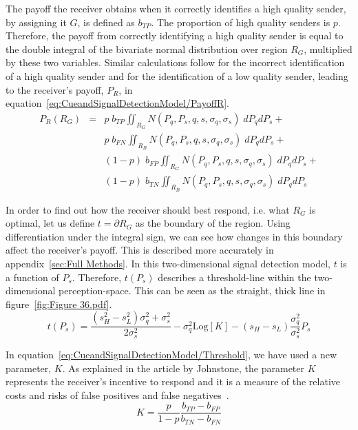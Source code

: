 \documentclass[a4paper,12pt]{article}
\numberwithin{equation}{section}
\begin{document}
The payoff the receiver obtains when it correctly identifies a high quality sender, by assigning it $G$, is defined as $b_{TP}$. The proportion of high quality senders is $p$. Therefore, the payoff from correctly identifying a high quality sender is equal to the double integral of the bivariate normal distribution over region $R_{G}$, multiplied by these two variables. Similar calculations follow for the incorrect identification of a high quality sender and for the identification of a low quality sender, leading to the receiver's payoff, $P_{R}$, in equation~\ref{eq:CueandSignalDetectionModel/PayoffR}.
\begin{equation}
\label{eq:CueandSignalDetectionModel/PayoffR}
\begin{array}{rcl}
P_{R}(R_{G}) &=& p \; b_{TP} \displaystyle \iint_{R_{G}} N(P_{q}, P_{s}, q, s, \sigma_{q}, \sigma_{s}) \; dP_{q}dP_{s} +\\
&&p \; b_{FN} \displaystyle \iint_{R_{B}} N(P_{q}, P_{s}, q, s, \sigma_{q}, \sigma_{s}) \; dP_{q}dP_{s} +\\
&&(1-p) \; b_{FP} \displaystyle \iint_{R_{G}} N(P_{q}, P_{s}, q, s, \sigma_{q}, \sigma_{s}) \; dP_{q}dP_{s} +\\
&&(1-p) \; b_{TN} \displaystyle \iint_{R_{B}} N(P_{q}, P_{s}, q, s, \sigma_{q}, \sigma_{s}) \; dP_{q}dP_{s}
\end{array}
\end{equation}

In order to find out how the receiver should best respond, i.e. what $R_{G}$ is optimal, let us define $t=\partial R_{G}$ as the boundary of the region. Using differentiation under the integral sign, we can see how changes in this boundary affect the receiver's payoff. This is described more accurately in appendix~\ref{sec:Full Methods}. In this two-dimensional signal detection model, $t$ is a function of $P_{s}$. Therefore, $t(P_{s})$ describes a threshold-line within the two-dimensional perception-space. This can be seen as the straight, thick line in figure~\ref{fig:Figure 36.pdf}.
\begin{equation}
\label{eq:CueandSignalDetectionModel/Threshold}
t(P_{s})=\frac{(s_{H}^2-s_{L}^2)\sigma_{q}^{2}+\sigma_{s}^{2}}{2 \sigma_{s}^{2}}-\sigma_{q}^{2}\text{Log}[K]-(s_{H}-s_{L})\frac{\sigma_{q}^{2}}{\sigma_{s}^{2}} P_{s}
\end{equation}

In equation~\ref{eq:CueandSignalDetectionModel/Threshold}, we have used a new parameter, $K$. As explained in the article by Johnstone, the parameter $K$ represents the receiver's incentive to respond and it is a measure of the relative costs and risks of false positives and false negatives~\cite{Johnstone1997}.
\begin{equation}
\label{eq:K}
K=\frac{p}{1-p}\frac{b_{TP}-b_{FP}}{b_{TN}-b_{FN}}
\end{equation}
\end{document}
